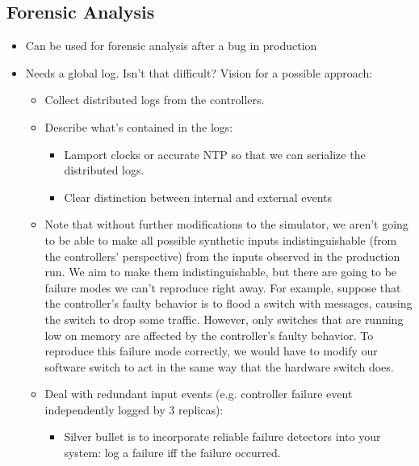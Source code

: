 \subsection{Forensic Analysis}

\begin{itemize}
\item Can be used for forensic analysis after a bug in production
\item Needs a global log. Isn't that difficult? Vision for a possible approach:
\begin{itemize}
\item Collect distributed logs from the controllers.
\item Describe what's contained in the logs:
  \begin{itemize}
   \item Lamport clocks or accurate NTP so that we can serialize the distributed logs.
   \item Clear distinction between internal and external events
  \end{itemize}
\item Note that without further modifications to the simulator, we aren't going to be able to make all possible synthetic inputs indistinguishable (from the controllers' perspective) from the inputs observed in the production run. We aim to make them indistinguishable, but there are going to be failure modes we can't reproduce right away. For example, suppose that the controller's faulty behavior is to flood a switch with messages, causing the switch to drop some traffic. However, only switches that are running low on memory are affected by the controller's faulty behavior. To reproduce this failure mode correctly, we would have to modify our software switch to act in the same way that the hardware switch does.
\item Deal with redundant input events (e.g. controller failure event independently logged by 3 replicas):
  \begin{itemize}
    \item Silver bullet is to incorporate reliable failure detectors into your system: log a failure iff the failure occurred.

\end{itemize}
\end{itemize}
\end{itemize}
